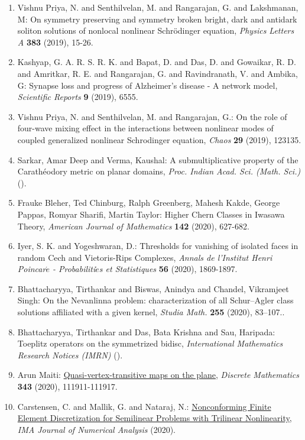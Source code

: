 \begin{enumerate}
\item Vishnu Priya, N. and Senthilvelan, M. and  Rangarajan, G. and Lakshmanan, M: On symmetry preserving and symmetry broken bright, dark and antidark soliton solutions of nonlocal nonlinear Schrödinger equation, \emph{Physics Letters A} {\bf 383} (2019), 15-26.
\item Kashyap, G. A. R. S. R. K. and Bapat, D. and Das, D. and Gowaikar, R. D. and Amritkar, R. E. and Rangarajan, G. and Ravindranath, V. and Ambika, G: Synapse loss and progress of Alzheimer’s disease - A network model, \emph{Scientific Reports} {\bf 9} (2019), 6555.
\item Vishnu Priya, N. and Senthilvelan, M. and Rangarajan, G.: On the role of four-wave mixing effect in the interactions between nonlinear modes of coupled generalized nonlinear Schrodinger equation, \emph{Chaos} {\bf 29} (2019), 123135.
\item Sarkar, Amar Deep and Verma, Kaushal: A submultiplicative property of the Carath\'{e}odory metric on planar domains, \emph{Proc. Indian Acad. Sci. (Math. Sci.)} {\bf } ().
\item Frauke Bleher, Ted Chinburg, Ralph Greenberg, Mahesh Kakde, George Pappas, Romyar Sharifi, Martin Taylor: Higher Chern Classes in Iwasawa Theory, \emph{American Journal of Mathematics} {\bf 142} (2020), 627-682.
\item Iyer, S. K. and Yogeshwaran, D.: Thresholds for vanishing of isolated faces in random Cech and Vietoris-Rips Complexes, \emph{Annals de l'Institut Henri Poincar$\acute{e}$ - Probabiliti$\acute{e}$s et Statistiques} {\bf 56} (2020), 1869-1897.
\item Bhattacharyya, Tirthankar and Biswas, Anindya and Chandel, Vikramjeet Singh: On the Nevanlinna problem: characterization of all Schur–Agler class solutions affiliated with a given kernel, \emph{Studia Math.} {\bf 255} (2020), 83–107..
\item Bhattacharyya, Tirthankar and Das, Bata Krishna and Sau, Haripada: Toeplitz operators on the symmetrized bidisc, \emph{International Mathematics Research Notices (IMRN)} {\bf } ().
\item Arun Maiti: \href{https://www.sciencedirect.com/science/article/pii/S0012365X20301035}{Quasi-vertex-transitive maps on the plane}, \emph{Discrete Mathematics} {\bf 343} (2020), 111911-111917.
\item Carstensen, C. and Mallik, G. and Nataraj, N.: \href{https://doi.org/10.1093/imanum/drz071}{Nonconforming Finite Element Discretization for Semilinear Problems with Trilinear Nonlinearity}, \emph{IMA Journal of Numerical Analysis} {\bf } (2020).

\end{enumerate}
